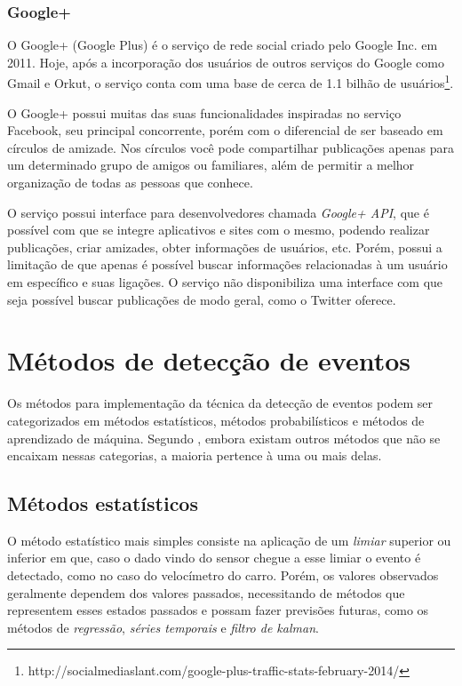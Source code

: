 \subsubsection*{Google+}

O Google+ (Google Plus) é o serviço de rede social criado pelo Google Inc. em 2011. Hoje, após a incorporação dos usuários de outros serviços do Google como Gmail e Orkut, o serviço conta com uma base de cerca de 1.1 bilhão de usuários\footnote{http://socialmediaslant.com/google-plus-traffic-stats-february-2014/}.

O Google+ possui muitas das suas funcionalidades inspiradas no serviço Facebook, seu principal concorrente, porém com o diferencial de ser baseado em círculos de amizade. Nos círculos você pode compartilhar publicações apenas para um determinado grupo de amigos ou familiares, além de permitir a melhor organização de todas as pessoas que conhece. 	

O serviço possui interface para desenvolvedores chamada \textit{Google+ API}, que é possível com que se integre aplicativos e sites com o mesmo, podendo realizar publicações, criar amizades, obter informações de usuários, etc. Porém, possui a limitação de que apenas é possível buscar informações relacionadas à um usuário em específico e suas ligações. O serviço não disponibiliza uma interface com que seja possível buscar publicações de modo geral, como o Twitter oferece.

\section{Métodos de detecção de eventos}

Os métodos para implementação da técnica da detecção de eventos podem ser categorizados em métodos estatísticos, métodos probabilísticos e métodos de aprendizado de máquina. Segundo , embora existam outros métodos que não se encaixam nessas categorias, a maioria pertence à uma ou mais delas.

\subsection{Métodos estatísticos}

O método estatístico mais simples consiste na aplicação de um \textit{limiar} superior ou inferior em que, caso o dado vindo do sensor chegue a esse limiar o evento é detectado, como no caso do velocímetro do carro. Porém, os valores observados geralmente dependem dos valores passados, necessitando de métodos que representem esses estados passados e possam fazer previsões futuras, como os métodos de \textit{regressão}, \textit{séries temporais} e \textit{filtro de kalman}.

